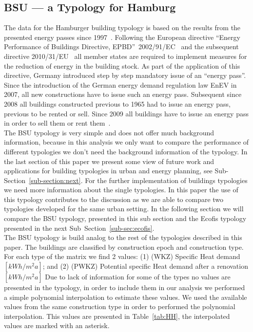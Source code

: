 

\subsection{BSU --- a Typology for Hamburg}\label{sub-sec:BSU}

The data for the Hamburger building typology is based on the results from the
presented energy passes since 1997~\cite{BSU.2011}.  Following the European
directive ``Energy Performance of Buildings Directive,
EPBD''~2002/91/EC~\cite{epbd.2002} and the subsequent directive
2010/31/EU~\cite{epbd.2010} all member states are required to implement
measures for the reduction of energy in the building stock.  As part of the
application of this directive, Germany introduced step by step mandatory issue
of an ``energy pass''. Since the introduction of the German energy demand
regulation law EnEV in 2007, all new constructions have to issue such an energy
pass.  Subsequent since 2008 all buildings constructed previous to 1965 had to
issue an energy pass, previous to be rented or sell.  Since 2009 all buildings
have to issue an energy pass in order to sell them or rent
them~\cite{BMVBS.2008}.\\

The BSU typology is very simple and does not offer much background information,
because in this analysis we only want to compare the performance of different
typologies we don't need the background information of the typology.  In the
last section of this paper we present some view of future work and applications
for building typologies in urban and energy planning, see
Sub-Section~\ref{sub-section:next}.  For the further implementation of
buildings typologies we need more information about the single typologies.  In
this paper the use of this typology contributes to the discussion as we are
able to compare two typologies developed for the same urban setting.  In the
following section we will compare the BSU typology, presented in this sub
section and the Ecofis typology presented in the next
Sub~Section~\ref{sub-sec:ecofis}.\\

The BSU typology is build analog to the rest of the typologies described in
this paper.  The buildings are classified by construction epoch and
construction type.  For each type of the matrix we find 2 values: (1) (WKZ)
Specific Heat demand $[kWh/m^{2}a]$; and (2) (PWKZ) Potential specific Heat
demand after a renovation $[kWh/m^{2}a]$ Due to lack of information for some of
the types no values are presented in the typology, in order to include them in
our analysis we performed a simple polynomial interpolation to estimate these
values.  We used the available values from the same construction type in order
to performed the polynomial interpolation.  This values are presented in
Table~\ref{tab:HH}, the interpolated values are marked with an asterisk.\\

